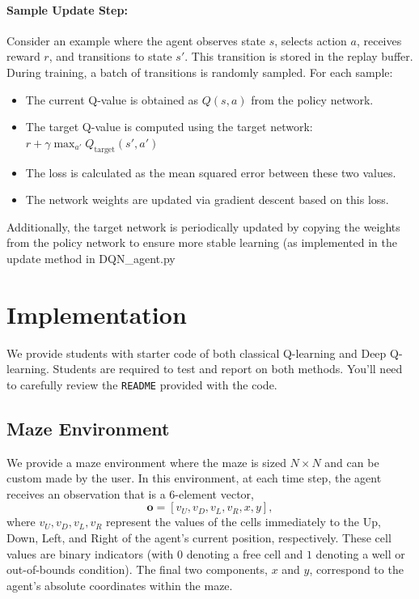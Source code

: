 \documentclass[12pt]{article}
\begin{document}
\paragraph{Sample Update Step:}
Consider an example where the agent observes state $s$, selects action $a$, receives
reward $r$, and transitions to state $s'$. This transition is stored in the replay buffer. During training, a batch of transitions is randomly sampled. For each sample:
\begin{itemize}
  \item The current Q-value is obtained as $Q(s,a)$ from the policy network.
  \item The target Q-value is computed using the target network: $r + \gamma \max_{a'} Q_{\text{target}}(s',a')$
  \item The loss is calculated as the mean squared error between these two values.
  \item The network weights are updated via gradient descent based on this loss.
\end{itemize}

Additionally, the target network is periodically updated by copying the weights from the policy network to
ensure more stable learning (as implemented in the update method in DQN\_agent.py





\section{Implementation}
We provide students with starter code of both classical Q-learning and Deep Q-learning. Students are required to test and report on both methods. You'll need to carefully review the \texttt{README} provided with the code.

\subsection{Maze Environment}
We provide a maze environment where the maze is sized $N\times N$ and can be custom made by the user. In this environment, at each time step, the agent receives an observation that is a 6-element vector,
\begin{equation}
\mathbf{o} = [v_U, v_D, v_L, v_R, x, y],
\end{equation}
where $v_U, v_D, v_L, v_R$ represent the values of the cells immediately to the Up, Down, Left, and Right of the agent's current position, respectively. These cell values are binary indicators (with $0$ denoting a free cell and $1$ denoting a well or out-of-bounds condition). The final two components, $x$ and $y$, correspond to the agent's absolute coordinates within the maze.
\end{document}
